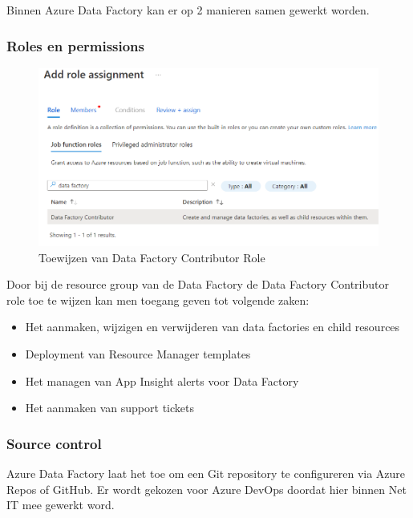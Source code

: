 Binnen Azure Data Factory kan er op 2 manieren samen gewerkt worden. 

\subsubsection{Roles en permissions}

\begin{figure}[H]
    \centering
    \includegraphics[width=1\textwidth]{./graphics/adf/adf_contributor.png}
    \caption{Toewijzen van Data Factory Contributor Role}
\end{figure}

Door bij de resource group van de Data Factory de Data Factory Contributor role toe te wijzen kan men toegang geven tot volgende zaken:
\begin{itemize}
    \item Het aanmaken, wijzigen en verwijderen van data factories en child resources
    \item Deployment van Resource Manager templates
    \item Het managen van App Insight alerts voor Data Factory
    \item Het aanmaken van support tickets
\end{itemize}

\subsubsection{Source control}

Azure Data Factory laat het toe om een Git repository te configureren via Azure Repos of GitHub. Er wordt gekozen voor Azure DevOps doordat hier binnen Net IT mee gewerkt word.



